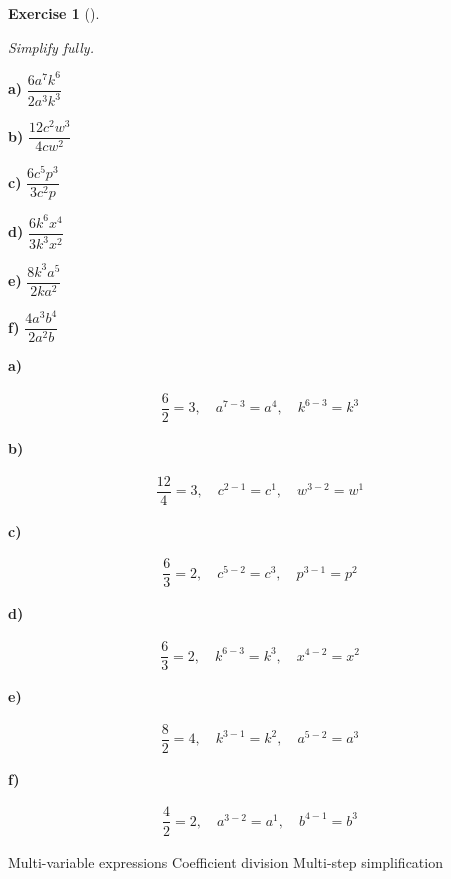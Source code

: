 \documentclass[
  letterpaper,
  DIV=11,
  numbers=noendperiod]{scrreprt}
\theoremstyle{definition}
\newtheorem{exercise}{Exercise}[chapter]
\theoremstyle{remark}
\begin{document}
\begin{exercise}[]\protect\hypertarget{exr-u2-24}{}\label{exr-u2-24}

\emph{Simplify fully.}

\textbf{a)} \(\displaystyle \dfrac{6a^{7}k^{6}}{2a^{3}k^{3}}\)

\textbf{b)} \(\displaystyle \dfrac{12c^{2}w^{3}}{4cw^{2}}\)

\textbf{c)} \(\displaystyle \dfrac{6c^{5}p^{3}}{3c^{2}p}\)

\textbf{d)} \(\displaystyle \dfrac{6k^{6}x^{4}}{3k^{3}x^{2}}\)

\textbf{e)} \(\displaystyle \dfrac{8k^{3}a^{5}}{2ka^{2}}\)

\textbf{f)} \(\displaystyle \dfrac{4a^{3}b^{4}}{2a^{2}b}\)

\begin{tcolorbox}[enhanced jigsaw, opacitybacktitle=0.6, coltitle=black, arc=.35mm, colframe=quarto-callout-tip-color-frame, colback=white, bottomrule=.15mm, left=2mm, colbacktitle=quarto-callout-tip-color!10!white, titlerule=0mm, opacityback=0, title=\textcolor{quarto-callout-tip-color}{\faLightbulb}\hspace{0.5em}{🔍 View Solutions}, leftrule=.75mm, breakable, rightrule=.15mm, bottomtitle=1mm, toptitle=1mm, toprule=.15mm]

\textbf{a)}

\[
\begin{aligned}
\dfrac{6}{2}=3,\quad a^{7-3}=a^{4},\quad k^{6-3}=k^{3}
\end{aligned}
\]

\textbf{b)}

\[
\begin{aligned}
\dfrac{12}{4}=3,\quad c^{2-1}=c^{1},\quad w^{3-2}=w^{1}
\end{aligned}
\]

\textbf{c)}

\[
\begin{aligned}
\dfrac{6}{3}=2,\quad c^{5-2}=c^{3},\quad p^{3-1}=p^{2}
\end{aligned}
\]

\textbf{d)}

\[
\begin{aligned}
\dfrac{6}{3}=2,\quad k^{6-3}=k^{3},\quad x^{4-2}=x^{2}
\end{aligned}
\]

\textbf{e)}

\[
\begin{aligned}
\dfrac{8}{2}=4,\quad k^{3-1}=k^{2},\quad a^{5-2}=a^{3}
\end{aligned}
\]

\textbf{f)}

\[
\begin{aligned}
\dfrac{4}{2}=2,\quad a^{3-2}=a^{1},\quad b^{4-1}=b^{3}
\end{aligned}
\]

\end{tcolorbox}

{Multi-variable expressions} {Coefficient division} {Multi-step
simplification}

\end{exercise}
\end{document}
